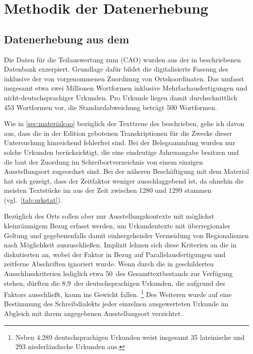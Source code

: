 \chapter{Methodik der Datenerhebung}
\label{ch:methoden}

\section%
	[Datenerhebung aus dem \tit{Corpus der altdeutschen Originalurkunden}]%
	{Datenerhebung aus dem }
\label{sec:miningcao}

Die Daten für die Teilauswertung zum  (CAO) wurden aus der in
\textcites[207]{beckerschallert2021}[155--158]{beckerschallert2022b}
beschriebenen Datenbank exzerpiert. Grundlage dafür bildet die digitalisierte
Fassung des \CAO{}
\autocites{cao-online}[vgl.~dazu][]{gniffkerapp2005} inklusive der von
\citeauthor{beckerschallert2022b} vorgenommenen Zuordnung von Ortskoordinaten.
Das \CAO{} umfasst insgesamt etwa zwei Millionen Wortformen inklusive
Mehrfachausfertigungen und nicht-deutschsprachiger Urkunden. Pro Urkunde liegen
damit durchschnittlich 453 Wortformen vor, die Standardabweichung beträgt 500
Wortformen.

Wie in \cref{sec:materialcao} bezüglich der Text\-treue des \CAO{}
beschrieben, gehe ich davon aus, dass die in der Edition gebotenen
Transkriptionen für die Zwecke dieser Untersuchung hinreichend fehlerfrei sind.
Bei der Belegsammlung wurden nur solche Urkunden berücksichtigt, die eine
eindeutige Jahresangabe besitzen und die laut der Zuordung im
Schreibortverzeichnis von \citet{cao-online} einem einzigen Ausstellungsort
zugeordnet sind. Bei der näheren Beschäftigung mit dem Material hat sich gezeigt, dass der Zeitfaktor weniger ausschlaggebend ist, da
ohnehin die meisten Textstücke im \CAO{} aus der Zeit zwischen 1280
und 1299 stammen (vgl.~\cref{tab:urkstat}).

Bezüglich des Orts sollen aber nur Ausstellungs\-kontexte mit möglichst
kleinräumigem Bezug erfasst werden, um Urkundentexte mit überregionaler Geltung
und gegebenenfalls damit einhergehender Vermeidung von Regionalismen nach
Möglichkeit auszuschließen. Implizit lehnen sich diese Kriterien an die in
\citet[41--42]{ganslmayer2012} diskutierten an, wobei der Faktor  in
Bezug auf Parallelausfertigungen und zeitferne Abschriften ignoriert wurde.
Wenn durch die in \citet[155--158]{beckerschallert2022b} geschilderten
Ausschlusskriterien lediglich etwa 50\pct\ des Gesamttextbestands zur Verfügung
stehen, dürften die 8,9\pct\ der deutschsprachigen Urkunden, die
\citeauthor{ganslmayer2012} aufgrund des Faktors  ausschließt, kaum
ins Gewicht fallen.%
%
	\footnote{Neben 4.289 deutschsprachigen Urkunden weist
		\citet[41]{ganslmayer2012} insgesamt 35 lateinische und 293
		niederländische Urkunden aus.}
%
Des Weiteren wurde auf eine Bestimmung des Schreibdialekts jeder einzelnen
ausgewerteten Urkunde im Abgleich mit ihrem angegebenen Ausstellungsort
verzichtet.

